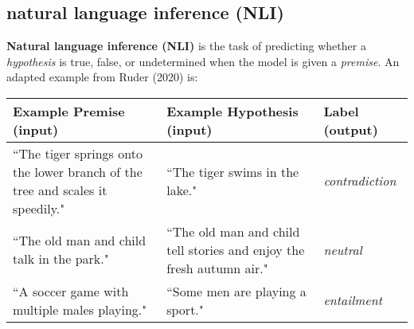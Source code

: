 \subsection{natural language inference (NLI)} \label{nlptask:naturallanguageinferenceNLI}

\textbf{Natural language inference (NLI)} is the task of predicting whether a \emph{hypothesis} is true, false, or undetermined when the model is given a \emph{premise}. An adapted example from  Ruder (2020) is: 



\begingroup

\setlength{\tabcolsep}{8pt} %
\renewcommand{\arraystretch}{2} %

\begin{center} 
\begin{tabularx}{0.8\textwidth} { 
  | >{\raggedright\arraybackslash}X
  | >{\raggedright\arraybackslash}X 
  | >{\centering\arraybackslash}X | } \hline 
  
\rowcolor{MyLavender} \textbf{Example Premise (input) }
& \textbf{Example Hypothesis (input)} 
& \textbf{Label (output)} \\ 

\hline

``The tiger springs onto the lower branch of the tree and scales it speedily."  
& ``The tiger swims in the lake."  
& \emph{contradiction}  \\ 

\hline 

``The old man and child talk in the park."
& ``The old man and child tell stories and enjoy the fresh autumn air."
& \emph{neutral} \\ 

\hline 

``A soccer game with multiple males playing." 
& ``Some men are playing a sport."
& \emph{entailment} \\ 

\hline  

\end{tabularx}
\end{center}
\endgroup





